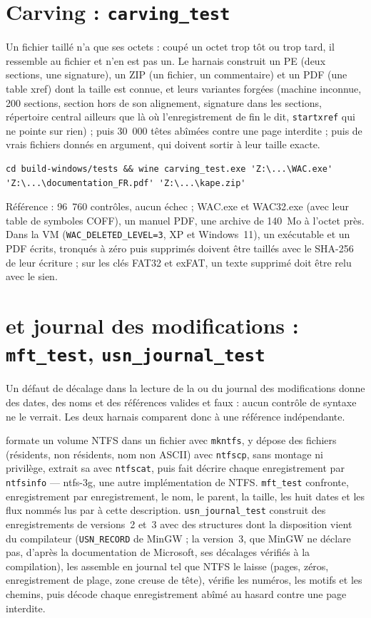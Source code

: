 \documentclass[11pt,a4paper,oneside]{report}
\begin{document}
\section{Carving : \texttt{carving\_test}}

Un fichier taillé n'a que ses octets : coupé un octet trop tôt ou trop tard,
il ressemble au fichier et n'en est pas un. Le harnais construit un PE (deux
sections, une signature), un ZIP (un fichier, un commentaire) et un PDF (une
table xref) dont la taille est connue, et leurs variantes forgées (machine
inconnue, 200 sections, section hors de son alignement, signature dans les
sections, répertoire central ailleurs que là où l'enregistrement de fin le
dit, \texttt{startxref} qui ne pointe sur rien) ; puis 30~000 têtes abîmées
contre une page interdite ; puis de vrais fichiers donnés en argument, qui
doivent sortir à leur taille exacte.

\begin{lstlisting}
cd build-windows/tests && wine carving_test.exe 'Z:\...\WAC.exe' 'Z:\...\documentation_FR.pdf' 'Z:\...\kape.zip'
\end{lstlisting}

Référence : 96~760 contrôles, aucun échec ; WAC.exe et WAC32.exe (avec leur
table de symboles COFF), un manuel PDF, une archive de 140~Mo à l'octet près.
Dans la VM (\texttt{WAC\_DELETED\_LEVEL=3}, XP et Windows~11), un
exécutable et un PDF écrits, tronqués à zéro puis supprimés doivent être
taillés avec le SHA-256 de leur écriture ; sur les clés FAT32 et exFAT, un
texte supprimé doit être relu avec le sien.

\section{ et journal des modifications : \texttt{mft\_test}, \texttt{usn\_journal\_test}}

Un défaut de décalage dans la lecture de la  ou du journal
des modifications donne des dates, des noms et des références valides et
faux : aucun contrôle de syntaxe ne le verrait. Les deux harnais comparent donc
\wac{} à une référence indépendante.

 formate un volume NTFS dans un fichier avec
\texttt{mkntfs}, y dépose des fichiers (résidents, non résidents, nom non
ASCII) avec \texttt{ntfscp}, sans montage ni privilège, extrait sa
 avec \texttt{ntfscat}, puis fait décrire chaque enregistrement
par \texttt{ntfsinfo} — ntfs-3g, une autre implémentation de NTFS.
\texttt{mft\_test} confronte, enregistrement par enregistrement, le nom, le
parent, la taille, les huit dates et les flux nommés lus par \wac{} à cette
description. \texttt{usn\_journal\_test} construit des enregistrements de
versions~2 et~3 avec des structures dont la disposition vient du compilateur
(\texttt{USN\_RECORD} de MinGW ; la version~3, que MinGW ne déclare pas,
d'après la documentation de Microsoft, ses décalages vérifiés à la
compilation), les assemble en journal tel que NTFS le laisse (pages, zéros,
enregistrement de plage, zone creuse de tête), vérifie les numéros, les motifs
et les chemins, puis décode chaque enregistrement abîmé au hasard contre une
page interdite.
\end{document}
